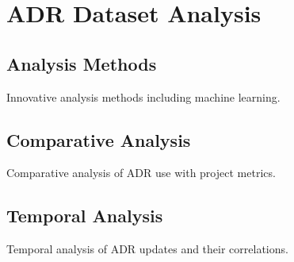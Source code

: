 \chapter{ADR Dataset Analysis}
    \section{Analysis Methods}
        Innovative analysis methods including machine learning.
    \section{Comparative Analysis}
        Comparative analysis of ADR use with project metrics.
    \section{Temporal Analysis}
        Temporal analysis of ADR updates and their correlations.
